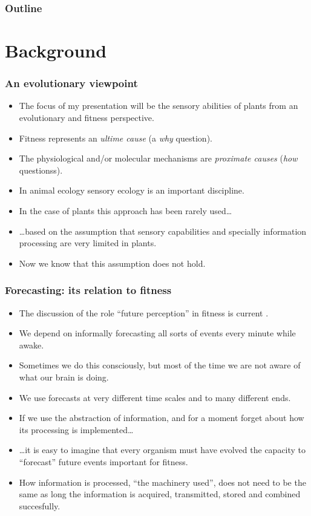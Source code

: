 \documentclass[10pt]{beamer}\usepackage[]{graphicx}\usepackage[]{color}
\begin{document}
	\begin{frame}
		\frametitle{Outline}
		\tableofcontents
	\end{frame}

\section{Background}

\begin{frame}[<+->]
  \frametitle{An evolutionary viewpoint}
  \begin{itemize}
    \item The focus of my presentation will be the sensory abilities of plants from an evolutionary and fitness perspective.
    \item Fitness represents an \emph{ultime cause} (a \emph{why} question).
    \item The physiological and/or molecular mechanisms are \emph{proximate causes} (\emph{how} questionss).
    \item In animal ecology sensory ecology is an important discipline.
    \item In the case of plants this approach has been rarely used\ldots
    \item \ldots based on the assumption that sensory capabilities and specially information processing are very limited in plants.
    \item Now we know that this assumption does not hold.
  \end{itemize}
\end{frame}


\begin{frame}[<+->]
  \frametitle{Forecasting: its relation to fitness}
  \begin{itemize}
    \item The discussion of the role ``future perception'' in fitness is current \autocite{Novoplansky2016a}.
    \item We depend on informally forecasting all sorts of events every minute while awake.
    \item Sometimes we do this consciously, but most of the time we are not aware of what our brain is doing.
    \item We use forecasts at very different time scales and to many different ends.
    \item If we use the abstraction of information, and for a moment forget about how its processing is implemented\ldots
    \item \ldots it is easy to imagine that every organism must have evolved the capacity to ``forecast'' future events important for fitness.
    \item How information is processed, ``the machinery used'', does not need to be the same as long the information is acquired, transmitted, stored and combined succesfully.
  \end{itemize}
\end{frame}
\end{document}
